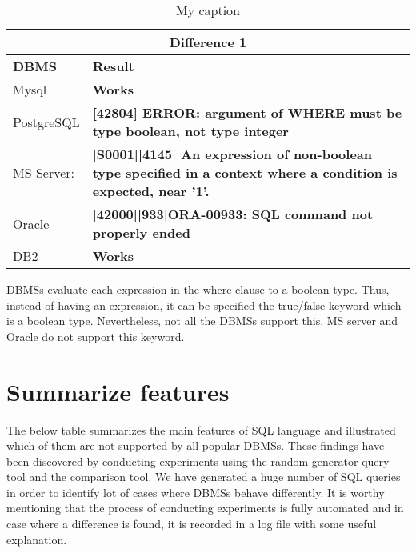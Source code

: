 \begin{table}[h]
\centering
\caption{My caption}
\label{my-label}
\begin{tabular}{|p{2cm}|p{12cm}|}
\hline
\multicolumn{2}{|c|}{\textbf{Difference 1}}                                                                                                                             \\ \hline
\textbf{DBMS} & \textbf{Result}                                                                                                                                         \\ \hline
Mysql         & {\color[HTML]{009901} \textbf{Works}}                                                                                                                   \\ \hline
PostgreSQL    & {\color[HTML]{FE0000} \textbf{{[}42804{]} ERROR: argument of WHERE must be type boolean, not type integer}}                                             \\ \hline
MS Server:    & {\color[HTML]{FE0000} \textbf{{[}S0001{]}{[}4145{]} An expression of non-boolean type specified in a context where a condition is expected, near '1'.}} \\ \hline
Oracle        & {\color[HTML]{FE0000} \textbf{{[}42000{]}{[}933{]}ORA-00933: SQL command not properly ended}}                                                           \\ \hline
DB2           & {\color[HTML]{009901} \textbf{Works}}                                                                                                                   \\ \hline
\end{tabular}
\end{table}

DBMSs evaluate each expression in the where clause to a boolean type. Thus, instead of having an expression, it can be specified the true/false keyword which is a boolean type. Nevertheless, not all the DBMSs support this. MS server and Oracle do not support this keyword.

\section{Summarize features}
The below table summarizes the main features of SQL language and illustrated which of them are not supported by all popular DBMSs. These findings have been discovered by conducting experiments using the random generator query tool and the comparison tool. We have generated a huge number of SQL queries in order to identify lot of cases where DBMSs behave differently. It is worthy mentioning that the process of conducting experiments is fully automated and in case where a difference is found, it is recorded in a log file with some useful explanation.    



